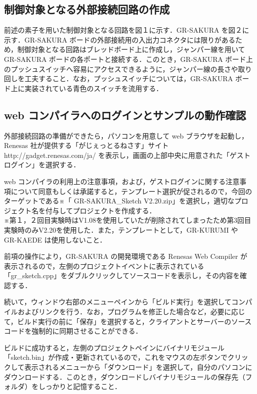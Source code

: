 \documentclass {ujarticle}
\begin{document}
 \subsection{制御対象となる外部接続回路の作成}
 前述の素子を用いた制御対象となる回路を図１に示す．GR-SAKURA を図２に示す．GR-SAKURA ボードの外部接続用の入出力コネクタには限りがあるため，制御対象となる回路はブレッドボード上に作成し，ジャンパー線を用いて GR-SAKURA ボードの各ポートと接続する．このとき，GR-SAKURA ボード上のプッシュスイッチへ容易にアクセスできるように，ジャンパー線の長さや取り回しを工夫すること．なお，プッシュスイッチについては，GR-SAKURA ボード上に実装されている青色のスイッチを流用する．
 
 \subsection{web コンパイラへのログインとサンプルの動作確認}
 外部接続回路の準備ができたら，パソコンを用意して web ブラウザを起動し，Renesas 社が提供する「がじぇっとるねさす」サイト http://gadget.renesas.com/ja/ を表示し，画面の上部中央に用意された「ゲストログイン」を選択する．　
 
 web コンパイラの利用上の注意事項，および，ゲストログインに関する注意事項について同意もしくは承諾すると，テンプレート選択が促されるので，今回のターゲットである※「 GR-SAKURA\_Sketch V2.20.zip」を選択し，適切なプロジェクト名を付与してプロジェクトを作成する．\\※第１，２回目実験時はV1.08を使用していたが削除されてしまったため第3回目実験時のみV2.20を使用した．また，テンプレートとして，GR-KURUMI や GR-KAEDE は使用しないこと．
 
 前項の操作により，GR-SAKURA の開発環境である Renesas Web Compiler が表示されるので，左側のプロジェクトイベントに表示されている「gr\_sketch.cpp」をダブルクリックしてソースコードを表示し，その内容を確認する．
 
 続いて，ウィンドウ右部のメニューペインから「ビルド実行」を選択してコンパイルおよびリンクを行う．なお，プログラムを修正した場合など，必要に応じて，ビルド実行の前に「保存」を選択すると，クライアントとサーバーのソースコードを強制的に同期させることができる．
 
 ビルドに成功すると，左側のプロジェクトペインにバイナリモジュール「sketch.bin」が作成・更新されているので，これをマウスの左ボタンでクリックして表示されるメニューから「ダウンロード」を選択して，自分のパソコンにダウンロードする．このとき，ダウンロードしバイナリモジュールの保存先（フォルダ）をしっかりと記憶すること．
 
\end{document}
